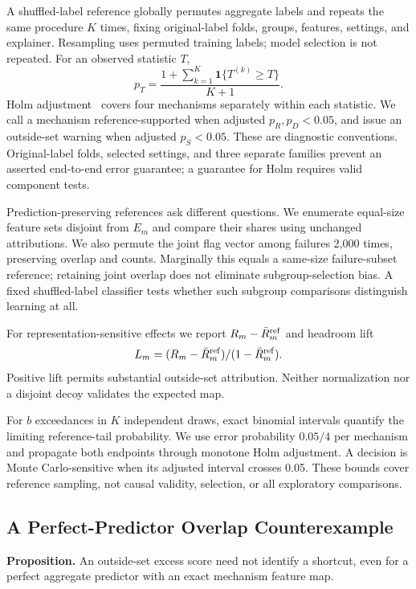 \documentclass[conference]{IEEEtran}
\begin{document}
A shuffled-label reference globally permutes aggregate labels and repeats the same procedure $K$ times, fixing original-label folds, groups, features, settings, and explainer. Resampling uses permuted training labels; model selection is not repeated. For an observed statistic $T$,
\begin{equation}
 p_T=\frac{1+\sum_{k=1}^K\mathbf 1\{T^{(k)}\geq T\}}{K+1}.
\end{equation}
Holm adjustment~\cite{holm1979simple} covers four mechanisms separately within each statistic. We call a mechanism reference-supported when adjusted $p_R,p_D<0.05$, and issue an outside-set warning when adjusted $p_S<0.05$. These are diagnostic conventions. Original-label folds, selected settings, and three separate families prevent an asserted end-to-end error guarantee; a guarantee for Holm requires valid component tests.

Prediction-preserving references ask different questions. We enumerate equal-size feature sets disjoint from $E_m$ and compare their shares using unchanged attributions. We also permute the joint flag vector among failures 2{,}000 times, preserving overlap and counts. Marginally this equals a same-size failure-subset reference; retaining joint overlap does not eliminate subgroup-selection bias. A fixed shuffled-label classifier tests whether such subgroup comparisons distinguish learning at all.

For representation-sensitive effects we report $R_m-\bar R_m^{\rm ref}$ and headroom lift
\begin{equation}
 L_m=(R_m-\bar R_m^{\rm ref})/(1-\bar R_m^{\rm ref}).
\end{equation}
Positive lift permits substantial outside-set attribution. Neither normalization nor a disjoint decoy validates the expected map.

For $b$ exceedances in $K$ independent draws, exact binomial intervals quantify the limiting reference-tail probability. We use error probability $0.05/4$ per mechanism and propagate both endpoints through monotone Holm adjustment. A decision is Monte Carlo-sensitive when its adjusted interval crosses 0.05. These bounds cover reference sampling, not causal validity, selection, or all exploratory comparisons.

\subsection{A Perfect-Predictor Overlap Counterexample}
\label{sec:counterexample}
\textbf{Proposition.} An outside-set excess score need not identify a shortcut, even for a perfect aggregate predictor with an exact mechanism feature map.
\end{document}
